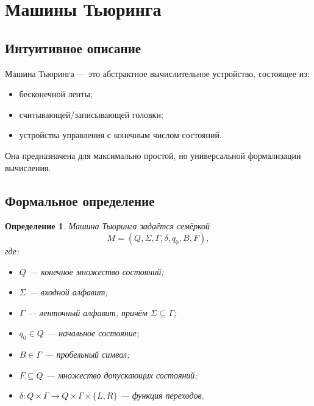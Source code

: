 \documentclass[12pt,a4paper]{article}
\newtheorem{definition}{Определение}
\begin{document}
\section{Машины Тьюринга}

\subsection{Интуитивное описание}
Машина Тьюринга --- это абстрактное вычислительное устройство, состоящее из:
\begin{itemize}
    \item бесконечной ленты;
    \item считывающей/записывающей головки;
    \item устройства управления с конечным числом состояний.
\end{itemize}

Она предназначена для максимально простой, но универсальной формализации вычисления.

\subsection{Формальное определение}
\begin{definition}
Машина Тьюринга задаётся семёркой
\[
M=(Q,\Sigma,\Gamma,\delta,q_0,B,F),
\]
где:
\begin{itemize}
    \item $Q$ --- конечное множество состояний;
    \item $\Sigma$ --- входной алфавит;
    \item $\Gamma$ --- ленточный алфавит, причём $\Sigma\subseteq\Gamma$;
    \item $q_0\in Q$ --- начальное состояние;
    \item $B\in \Gamma$ --- пробельный символ;
    \item $F\subseteq Q$ --- множество допускающих состояний;
    \item $\delta:Q\times \Gamma \to Q\times \Gamma \times \{L,R\}$ --- функция переходов.
\end{itemize}
\end{definition}
\end{document}
